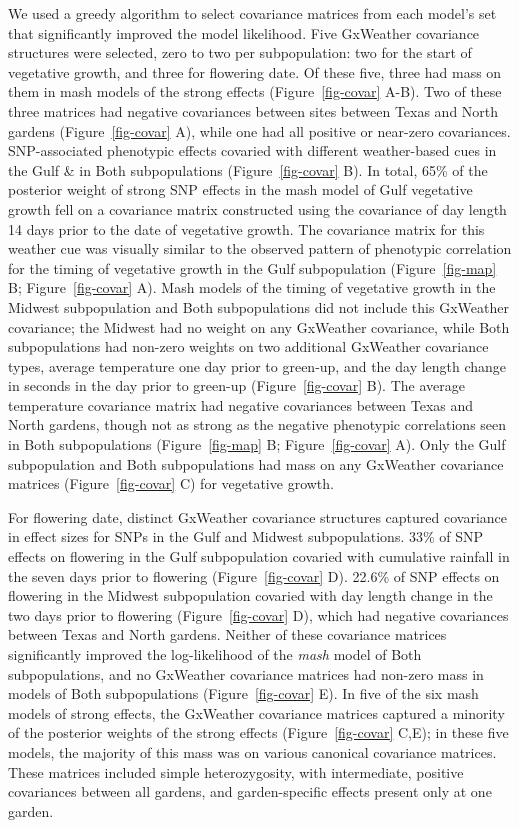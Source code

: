 \documentclass[
  9pt,
  twocolumn,
  twoside]{pnas-new}
\begin{document}
We used a greedy algorithm to select covariance matrices from each
model's set that significantly improved the model likelihood. Five
GxWeather covariance structures were selected, zero to two per
subpopulation: two for the start of vegetative growth, and three for
flowering date. Of these five, three had mass on them in mash models of
the strong effects (Figure~\ref{fig-covar} A-B). Two of these three
matrices had negative covariances between sites between Texas and North
gardens (Figure~\ref{fig-covar} A), while one had all positive or
near-zero covariances. SNP-associated phenotypic effects covaried with
different weather-based cues in the Gulf \& in Both subpopulations
(Figure~\ref{fig-covar} B). In total, 65\% of the posterior weight of
strong SNP effects in the mash model of Gulf vegetative growth fell on a
covariance matrix constructed using the covariance of day length 14 days
prior to the date of vegetative growth. The covariance matrix for this
weather cue was visually similar to the observed pattern of phenotypic
correlation for the timing of vegetative growth in the Gulf
subpopulation (Figure~\ref{fig-map} B; Figure~\ref{fig-covar} A). Mash
models of the timing of vegetative growth in the Midwest subpopulation
and Both subpopulations did not include this GxWeather covariance; the
Midwest had no weight on any GxWeather covariance, while Both
subpopulations had non-zero weights on two additional GxWeather
covariance types, average temperature one day prior to green-up, and the
day length change in seconds in the day prior to green-up
(Figure~\ref{fig-covar} B). The average temperature covariance matrix
had negative covariances between Texas and North gardens, though not as
strong as the negative phenotypic correlations seen in Both
subpopulations (Figure~\ref{fig-map} B; Figure~\ref{fig-covar} A). Only
the Gulf subpopulation and Both subpopulations had mass on any GxWeather
covariance matrices (Figure~\ref{fig-covar} C) for vegetative growth.

For flowering date, distinct GxWeather covariance structures captured
covariance in effect sizes for SNPs in the Gulf and Midwest
subpopulations. 33\% of SNP effects on flowering in the Gulf
subpopulation covaried with cumulative rainfall in the seven days prior
to flowering (Figure~\ref{fig-covar} D). 22.6\% of SNP effects on
flowering in the Midwest subpopulation covaried with day length change
in the two days prior to flowering (Figure~\ref{fig-covar} D), which had
negative covariances between Texas and North gardens. Neither of these
covariance matrices significantly improved the log-likelihood of the
\emph{mash} model of Both subpopulations, and no GxWeather covariance
matrices had non-zero mass in models of Both subpopulations
(Figure~\ref{fig-covar} E). In five of the six mash models of strong
effects, the GxWeather covariance matrices captured a minority of the
posterior weights of the strong effects (Figure~\ref{fig-covar} C,E); in
these five models, the majority of this mass was on various canonical
covariance matrices. These matrices included simple heterozygosity, with
intermediate, positive covariances between all gardens, and
garden-specific effects present only at one garden.
\end{document}
